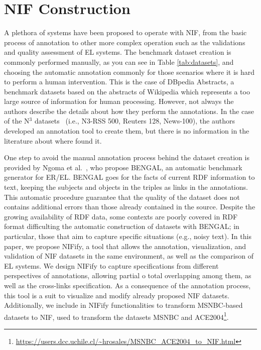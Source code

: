 \documentclass[sigconf]{acmart}
\begin{document}
\section{NIF Construction}
A plethora of systems have been proposed to operate with NIF, from the basic process of annotation to other more complex operation such as the validations and quality assessment of EL systems. The benchmark dataset creation is commonly performed manually, as you can see in Table \ref{tab:datasets}, and choosing the automatic annotation commonly for those scenarios where it is hard to perform a human intervention. This is the case of DBpedia Abstracts, a benchmark datasets based on the abstracts of Wikipedia which represents a too large source of information for human processing. However, not always the authors describe the details about how they perform the annotations. In the case of the N$^3$ datasets~\cite{N3} (i.e., N3-RSS 500, Reuters 128, News-100), the authors developed an annotation tool to create them, but there is no information in the literature about where found it. 

One step to avoid the manual annotation process behind the dataset creation is provided by Ngoma et al.~\cite{Bengal2018}, who propose BENGAL, an automatic benchmark generator for ER/EL. BENGAL goes for the facts of current RDF information to text, keeping the subjects and objects in the triples as links in the annotations. This automatic procedure guarantee that the quality of the dataset does not contains additional errors than those already contained in the source. Despite the growing availability of RDF data, some contexts are poorly covered in RDF format difficulting the automatic construction of datasets with BENGAL; in particular, those that aim to capture specific situations (e.g., noisy text).
In this paper, we propose NIFify, a tool that allows the annotation, visualization, and validation of NIF datasets in the same environment, as well as the comparison of EL systems. We design NIFify to capture specifications from different perspectives of annotations, allowing partial o total overlapping among them, as well as the cross-links specification. As a consequence of the annotation process, this tool is a suit to visualize and modify already proposed NIF datasets. Additionally, we include in NIFify functionalities to transform MSNBC-based datasets to NIF, used to transform the datasets MSNBC and ACE2004\footnote{\url{https://users.dcc.uchile.cl/~hrosales/MSNBC_ACE2004_to_NIF.html}}. 
\end{document}
